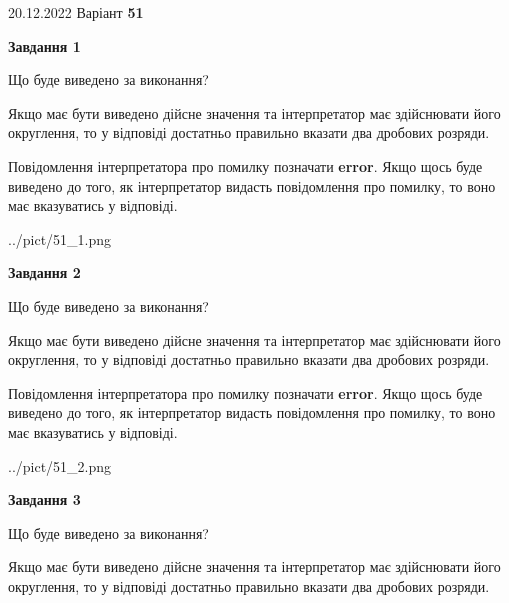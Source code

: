 \documentclass[12pt, ukrainian]{article}
\begin{document}
{20.12.2022 Варіант \No \textbf { 51 }\par}
{
\begin {Large}

{\begin {center}\textbf{Завдання 1}\end {center}}\par
Що буде виведено за виконання? \par

Якщо має бути виведено дійсне значення та інтерпретатор має здійснювати його округлення, 
то у відповіді достатньо правильно вказати два дробових розряди.

Повідомлення інтерпретатора про помилку позначати \textbf{error}.
Якщо щось буде виведено до того, як інтерпретатор видасть повідомлення про помилку, 
то воно має вказуватись у відповіді. \par

\begin{center}
	{../pict/51_1.png}
\end{center}
\newpage

{\begin {center}\textbf{Завдання 2}\end {center}}\par
Що буде виведено за виконання? \par

Якщо має бути виведено дійсне значення та інтерпретатор має здійснювати його округлення, 
то у відповіді достатньо правильно вказати два дробових розряди.

Повідомлення інтерпретатора про помилку позначати \textbf{error}.
Якщо щось буде виведено до того, як інтерпретатор видасть повідомлення про помилку, 
то воно має вказуватись у відповіді. \par

\begin{center}
	{../pict/51_2.png}
\end{center}
\newpage

{\begin {center}\textbf{Завдання 3}\end {center}}\par
Що буде виведено за виконання? \par

Якщо має бути виведено дійсне значення та інтерпретатор має здійснювати його округлення, 
то у відповіді достатньо правильно вказати два дробових розряди.


\end{Large}}
\end{document}
